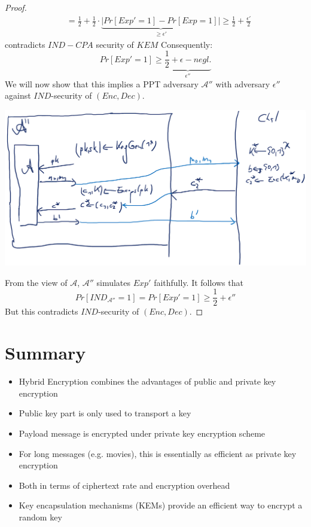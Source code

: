 \begin{proof}
\begin{align*}
    	                                          &= \frac{1}{2} + \frac{1}{2} \cdot \underbrace{|Pr[Exp'=1]-Pr[Exp=1]|}_{\geq \epsilon'} \geq \frac{1}{2} + \frac{\epsilon'}{2}
    	\end{align*}
    	contradicts $IND-CPA$ security of $KEM$
    	Consequently: 
    	    $$Pr[Exp'=1] \geq \underbrace{\frac{1}{2} + \epsilon - negl.}_{\epsilon''}$$
    	We will now show that this implies a PPT adversary $\mathcal{A}''$ with adversary $\epsilon''$ against $IND$-security of $(Enc,Dec)$.
    	\begin{center}
    		\includegraphics[width=160mm]{Graphics/Hybrid Encryption/he7.png}
    	\end{center}
    	From the view of $\mathcal{A}$, $\mathcal{A}''$ simulates $Exp'$ faithfully.
    	It follows that
    	    $$Pr[IND_{\mathcal{A}''}=1] = Pr[Exp'=1] \geq \frac{1}{2} + \epsilon''$$
        But this contradicts $IND$-security of $(Enc,Dec)$.
    \end{proof}

\section{Summary}
    \begin{itemize}
        \item Hybrid Encryption combines the advantages of public and private key encryption
        \item Public key part is only used to transport a key
        \item Payload message is encrypted under private key encryption scheme
        \item For long messages (e.g. movies), this is essentially as efficient as private key encryption
        \item Both in terms of ciphertext rate and encryption overhead
        \item Key encapsulation mechanisms (KEMs) provide an efficient way to encrypt a random key
    \end{itemize}





